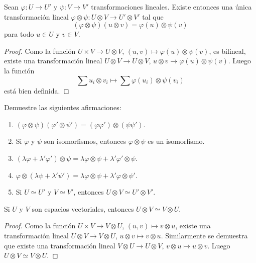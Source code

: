 \begin{exercise}
\begin{lemma}
	Sean $\varphi\colon U\to U'$ y $\psi\colon V\to V'$ transformaciones
	lineales. Existe entonces una única transformación lineal
	$\varphi\otimes\psi\colon U\otimes V\to U'\otimes V'$ tal que
	\[
		(\varphi\otimes\psi)(u\otimes v)=\varphi(u)\otimes\psi(v)
	\]
	para todo $u\in U$ y $v\in V$.
\end{lemma}

\begin{proof}
	Como la función $U\times V\to U\otimes V$,
	$(u,v)\mapsto\varphi(u)\otimes\psi(v)$, es bilineal, existe una
	transformación lineal $U\otimes V\to U\otimes V$, $u\otimes
	v\to\varphi(u)\otimes\psi(v)$. Luego la función
	\[
		\sum u_i\otimes v_i\mapsto\sum\varphi(u_i)\otimes\psi(v_i)
	\]
	está bien definida. 
\end{proof}

\begin{exercise}
	Demuestre las siguientes afirmaciones:
	\begin{enumerate}
		\item $(\varphi\otimes\psi)(\varphi'\otimes\psi')=(\varphi\varphi')\otimes(\psi\psi')$.
		\item Si $\varphi$ y $\psi$ son isomorfismos, entonces
			$\varphi\otimes\psi$ es un isomorfismo. 
		\item $(\lambda\varphi+\lambda'\varphi')\otimes\psi=\lambda\varphi\otimes\psi+\lambda'\varphi'\otimes\psi$.
		\item $\varphi\otimes(\lambda\psi+\lambda'\psi')=\lambda\varphi\otimes\psi+\lambda'\varphi\otimes\psi'$.
		\item Si $U\simeq U'$ y $V\simeq V'$, entonces $U\otimes V\simeq U'\otimes V'$.
	\end{enumerate}
\end{exercise}

\begin{lemma}
	Si $U$ y $V$ son espacios vectoriales, entonces 
	$U\otimes V\simeq V\otimes U$.
\end{lemma}

\begin{proof}
	Como la función $U\times V\to V\otimes U$, $(u,v)\mapsto v\otimes u$,
	existe una transformación lineal $U\otimes V\to V\otimes U$, $u\otimes
	v\mapsto v\otimes u$. Similarmente se demuestra que existe una
	transformación lineal $V\otimes U\to U\otimes V$, $v\otimes u\mapsto
	u\otimes v$. Luego $U\otimes V\simeq V\otimes U$.
\end{proof}


\end{exercise}
